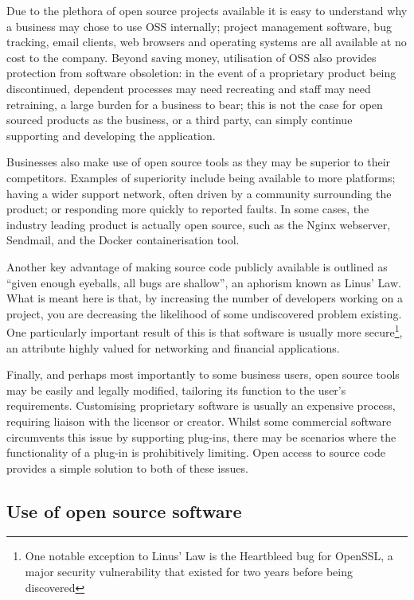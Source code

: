 \documentclass[a4paper]{article}
\begin{document}
Due to the plethora of open source projects available it is easy to understand why a business may chose to use OSS internally; project management software, bug tracking, email clients, web browsers and operating systems are all available at no cost to the company. Beyond saving money, utilisation of OSS also provides protection from software obsoletion: in the event of a proprietary product being discontinued, dependent processes may need recreating and staff may need retraining, a large burden for a business to bear; this is not the case for open sourced products as the business, or a third party, can simply continue supporting and developing the application.

Businesses also make use of open source tools as they may be superior to their competitors. Examples of superiority include being available to more platforms; having a wider support network, often driven by a community surrounding the product; or responding more quickly to reported faults\cite{cio}. In some cases, the industry leading product is actually open source, such as the Nginx webserver\cite{nginx}, Sendmail\cite{sendmail}, and the Docker containerisation tool\cite{docker}.

Another key advantage of making source code publicly available is outlined as “given enough eyeballs, all bugs are shallow”, an aphorism known as Linus’ Law\cite{catb}. What is meant here is that, by increasing the number of developers working on a project, you are decreasing the likelihood of some undiscovered problem existing. One particularly important result of this is that software is usually more secure\footnote{One notable exception to Linus’ Law is the Heartbleed bug for OpenSSL, a major security vulnerability that existed for two years before being discovered\cite{heartbleed}}, an attribute highly valued for networking and financial applications\cite{secureoss}.

Finally, and perhaps most importantly to some business users, open source tools may be easily and legally modified, tailoring its function to the user’s requirements. Customising proprietary software is usually an expensive process, requiring liaison with the licensor or creator. Whilst some commercial software circumvents this issue by supporting plug-ins, there may be scenarios where the functionality of a plug-in is prohibitively limiting. Open access to source code provides a simple solution to both of these issues.

\subsection{Use of open source software}
\end{document}
